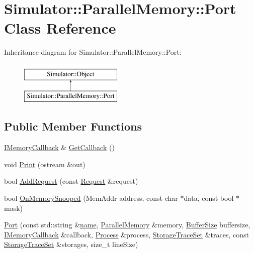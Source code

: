 \hypertarget{class_simulator_1_1_parallel_memory_1_1_port}{\section{Simulator\+:\+:Parallel\+Memory\+:\+:Port Class Reference}
\label{class_simulator_1_1_parallel_memory_1_1_port}
}
Inheritance diagram for Simulator\+:\+:Parallel\+Memory\+:\+:Port\+:\begin{figure}[H]
\begin{center}
\leavevmode
\includegraphics[height=2.000000cm]{class_simulator_1_1_parallel_memory_1_1_port}
\end{center}
\end{figure}
\subsection*{Public Member Functions}
\begin{DoxyCompactItemize}
\item 
\hyperlink{class_simulator_1_1_i_memory_callback}{I\+Memory\+Callback} \& \hyperlink{class_simulator_1_1_parallel_memory_1_1_port_ae82e4d23a41a8db79e37dea33a0ffba8}{Get\+Callback} ()
\item 
void \hyperlink{class_simulator_1_1_parallel_memory_1_1_port_aed959a7c45a68f61d69936fab0e2a2fd}{Print} (ostream \&out)
\item 
bool \hyperlink{class_simulator_1_1_parallel_memory_1_1_port_a855633c11d41d59fb370c7a68084fe7a}{Add\+Request} (const \hyperlink{struct_simulator_1_1_parallel_memory_1_1_request}{Request} \&request)
\item 
bool \hyperlink{class_simulator_1_1_parallel_memory_1_1_port_a4aef3332e642bb5182d988a2901b435d}{On\+Memory\+Snooped} (Mem\+Addr address, const char $\ast$data, const bool $\ast$mask)
\item 
\hyperlink{class_simulator_1_1_parallel_memory_1_1_port_a8c4c42288501c743cdd75f92903b5c02}{Port} (const std\+::string \&\hyperlink{mtconf_8c_a8f8f80d37794cde9472343e4487ba3eb}{name}, \hyperlink{class_simulator_1_1_parallel_memory}{Parallel\+Memory} \&memory, \hyperlink{namespace_simulator_a5ca279f926485be2d0554e41275a3305}{Buffer\+Size} buffersize, \hyperlink{class_simulator_1_1_i_memory_callback}{I\+Memory\+Callback} \&callback, \hyperlink{class_simulator_1_1_process}{Process} \&process, \hyperlink{class_simulator_1_1_storage_trace_set}{Storage\+Trace\+Set} \&traces, const \hyperlink{class_simulator_1_1_storage_trace_set}{Storage\+Trace\+Set} \&storages, size\+\_\+t line\+Size)
\end{DoxyCompactItemize}


